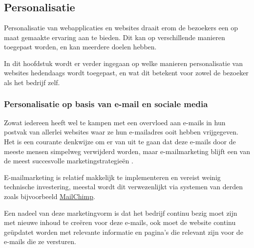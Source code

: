 \chapter{}
\label{ch:stand-van-zaken}



\section{Personalisatie}
\label{sec:Personalisatie}

Personalisatie van webapplicaties en websites draait erom de bezoekers een op maat gemaakte ervaring aan te bieden. Dit kan op verschillende manieren toegepast worden, en kan meerdere doelen hebben. 

In dit hoofdstuk wordt er verder ingegaan op welke manieren personalisatie van websites hedendaags wordt toegepast, en wat dit betekent voor zowel de bezoeker als het bedrijf zelf.

\subsection{Personalisatie op basis van e-mail en sociale media}
\label{subsec:Personalisatie op basis van e-mail en Social Media}

Zowat iedereen heeft wel te kampen met een overvloed aan e-mails in hun postvak van allerlei websites waar ze hun e-mailadres ooit hebben vrijgegeven. Het is een courante denkwijze om er van uit te gaan dat deze  e-mails door de meeste mensen simpelweg verwijderd worden, maar e-mailmarketing blijft een van de meest succesvolle marketingstrategieën \autocite{Dehkordi2012}. 

E-mailmarketing is relatief makkelijk te implementeren en vereist weinig technische investering, meestal wordt dit verwezenlijkt via systemen van derden zoals bijvoorbeeld \href{https://mailchimp.com/}{MailChimp}. 

Een nadeel van deze marketingvorm is dat het bedrijf continu bezig moet zijn met nieuwe inhoud te creëren voor deze e-mails, ook moet de website continu geüpdatet worden met relevante informatie en pagina's die relevant zijn voor de e-mails die ze versturen.

